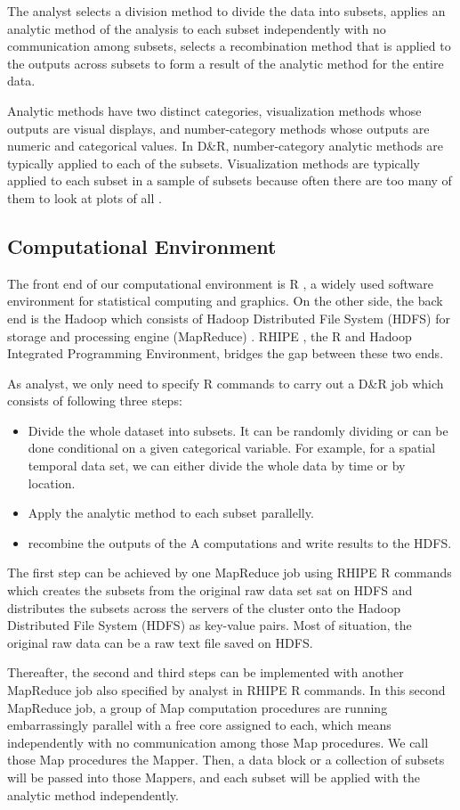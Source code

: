 The 
analyst selects a division method to divide the data into subsets, applies an 
analytic method of the analysis to each subset independently with no communication
among subsets, selects a recombination method that is applied to the outputs 
across subsets to form a result of the analytic method for the entire data.

Analytic methods have two distinct categories, visualization methods whose outputs
are visual displays, and number-category methods whose outputs are numeric and 
categorical values. In D\&R, number-category analytic methods are typically applied
to each of the subsets. Visualization methods are typically applied to each subset 
in a sample of subsets because often there are too many of them to look at plots 
of all \cite{Hafen:2013}.
 
\subsection{Computational Environment}

The front end of our computational environment is R \cite{R}, a widely used 
software environment for statistical computing and graphics. On the other side, the
back end is the Hadoop which consists of Hadoop Distributed File 
System (HDFS) \cite{HDFS} for storage and processing engine (MapReduce) 
\cite{mapreduce}. RHIPE \cite{Guha:2010}, the R and Hadoop Integrated Programming 
Environment, bridges the gap between these two ends. 

As analyst, we only need to specify R commands to carry out a D\&R job which
consists of following three steps:
\begin{itemize}
\item Divide the whole dataset into subsets. It can be randomly dividing or
can be done conditional on a given categorical variable. For example, for a spatial
temporal data set, we can either divide the whole data by time or by location. 
\item Apply the analytic method to each subset parallelly.   
\item recombine the outputs of the A computations and write results to the HDFS. 
\end{itemize}  

The first step can be achieved by one MapReduce job using RHIPE R commands which 
creates the subsets from the original raw data set sat on HDFS and 
distributes the subsets across the servers of the cluster onto the Hadoop 
Distributed File System (HDFS) as key-value pairs. Most of situation, the original
raw data can be a raw text file saved on HDFS.

Thereafter, the second and
third steps can be implemented with another MapReduce job also specified by
analyst in RHIPE R commands. In this second MapReduce job, a group of Map
computation procedures are running embarrassingly parallel with a free core 
assigned to each, which means independently with no communication among those Map
procedures. We call those Map procedures the Mapper. Then, a data block or a 
collection of subsets will be passed into those Mappers, and each subset
will be applied with the analytic method independently.

